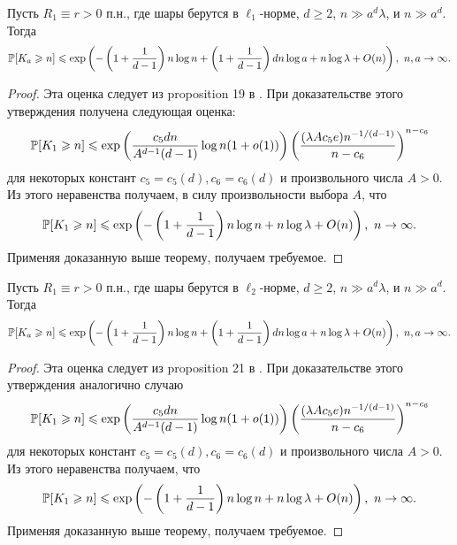 \begin{cor}
Пусть $R_1\equiv r > 0$ п.н., где шары берутся в $\ell_1$-норме, $d\geq 2$, $n \gg a^d\lambda$, и $n\gg a^d$. 
Тогда $$\mathbb{P}[K_a \geqslant n] \leqslant \exp \left(-\left(1+\dfrac{1}{d-1}\right)n\log n + \left(1+\dfrac{1}{d-1}\right)dn\log a  +n\log\lambda + O(n)\right),\  n, a\to \infty.$$
\end{cor}{}

\begin{proof}
    Эта оценка следует из proposition 19 в \cite{AL}. При доказательстве этого утверждения получена следующая оценка:
    $$\mathbb{P}[K_1 \geqslant n] \leqslant \exp\left(\dfrac{c_5 dn}{A^{d-1}(d-1)}\log n(1 + o(1))\right)\left(\dfrac{(\lambda Ac_5e)n^{-1/(d-1)}}{n-c_6}\right)^{n-c_6}$$ для некоторых констант $c_5 = c_5(d), c_6 = c_6(d)$ и произвольного числа $A>0$. Из этого неравенства получаем, в силу произвольности выбора $A$, что
    $$\mathbb{P} [K_1 \geqslant n] \leqslant \exp \left(-\left(1+\dfrac{1}{d-1}\right)n\log n   +n\log\lambda + O(n)\right),\  n \to \infty.$$ Применяя доказанную выше теорему, получаем требуемое.
\end{proof}{}

\begin{cor}
Пусть $R_1\equiv r > 0$ п.н., где шары берутся в $\ell_2$-норме, $d\geq 2$, $n \gg a^d\lambda$, и $n\gg a^d$. 
Тогда $$\mathbb{P}[K_a \geqslant n] \leqslant \exp \left(-\left(1+\dfrac{1}{d-1}\right)n\log n + \left(1+\dfrac{1}{d-1}\right)dn\log a  +n\log\lambda + O(n)\right),\  n, a\to \infty.$$
\end{cor}{}

\begin{proof}
    Эта оценка следует из proposition 21 в \cite{AL}. При доказательстве этого утверждения аналогично случаю $$\mathbb{P}[K_1 \geqslant n] \leqslant \exp\left(\dfrac{c_5 dn}{A^{d-1}(d-1)}\log n(1 + o(1))\right)\left(\dfrac{(\lambda Ac_5e)n^{-1/(d-1)}}{n-c_6}\right)^{n-c_6}$$ для некоторых констант $c_5 = c_5(d), c_6 = c_6(d)$ и произвольного числа $A>0$. Из этого неравенства получаем, что
    $$\mathbb{P}[K_1 \geqslant n] \leqslant \exp \left(-\left(1+\dfrac{1}{d-1}\right)n\log n   +n\log\lambda + O(n)\right),\  n \to \infty.$$ Применяя доказанную выше теорему, получаем требуемое.
\end{proof}{}


